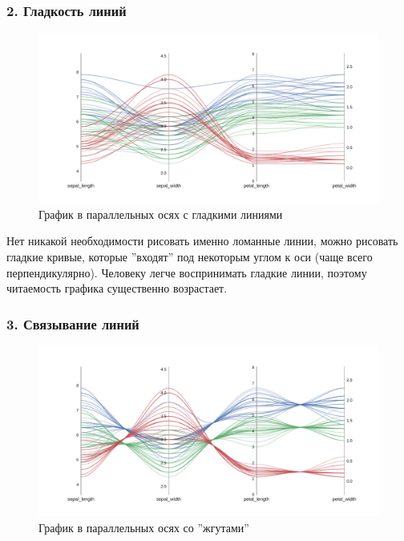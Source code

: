 \documentclass[12pt,fleqn]{article}
\begin{document}
\subsubsection{2. Гладкость линий}

\begin{figure}[htb]
    \centering
    \includegraphics[width=15cm]{smooth_pc.pdf}
    \caption{График в параллельных осях с гладкими линиями}
    \label{smooth_pc}
\end{figure}

Нет никакой необходимости рисовать именно ломанные линии, можно рисовать гладкие кривые, 
которые ''входят'' под некоторым углом к оси (чаще всего перпендикулярно).
Человеку легче воспринимать гладкие линии, поэтому
читаемость графика существенно возрастает.\cite{state_of_the_art}

\subsubsection{3. Связывание линий}

\begin{figure}[htb]
    \centering
    \includegraphics[width=15cm]{bundle_0.01_pc.pdf}
    \caption{График в параллельных осях со ''жгутами''}
    \label{bundle0.01_pc}
\end{figure}
\end{document}
